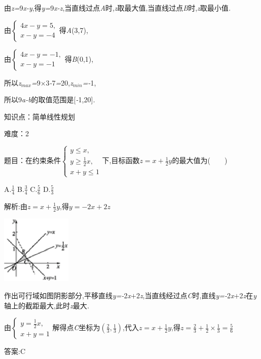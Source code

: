 \documentclass{article} %
\begin{document}
由\textit{z=}9\textit{x-y},得\textit{y=}9\textit{x-z},当直线过点\textit{A}时,\textit{z}取最大值,当直线过点\textit{B}时,\textit{z}取最小值\textit{.}

由$
\begin{cases}
4x-y=5,\\
x-y=-4
\end{cases}$得\textit{A}(3,7),

由$
\begin{cases}
4x-y=-1,\\
x-y=-1
\end{cases}$得\textit{B}(0,1),

所以\textit{z}${}_{max}$\textit{=}9\textit{$\times$}3\textit{-}7\textit{=}20,\textit{z}${}_{min}$\textit{=-}1,

所以9\textit{a-b}的取值范围是[\textit{-}1,20]\textit{.}

知识点：简单线性规划

难度：2

题目：在约束条件$
\begin{cases}
y \le x,\\
y \ge \frac{1}{2}x,\\
x+y \le 1
\end{cases}$下,目标函数$z=x+\frac{1}{2}y$的最大值为(\textit{　　})

 A.$\frac{1}{4}$ B.$\frac{3}{4}$ C.$\frac{5}{6}$ D.$\frac{5}{3}$

 解析:由$z=x+\frac{1}{2}y$,得$y=-2x+2z$

 \includegraphics*[width=1.32in, height=1.29in, keepaspectratio=false]{image1634}

作出可行域如图阴影部分,平移直线\textit{y=-}2\textit{x$+$}2\textit{z},当直线经过点\textit{C}时,直线\textit{y=-}2\textit{x$+$}2\textit{z}在\textit{y}轴上的截距最大,此时\textit{z}最大\textit{.}

由$
\begin{cases}
y=\frac{1}{2}x,\\
x+y=1
\end{cases}$解得点\textit{C}坐标为$(\frac{2}{3},\frac{1}{3})$,代入$z=x+\frac{1}{2}y$,得$z=\frac{2}{3}+\frac{1}{2}\times\frac{1}{3}=\frac{5}{6}$

 答案:C
\end{document}
